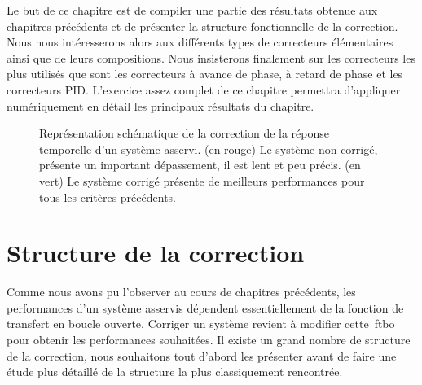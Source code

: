 Le but de ce chapitre est de compiler une partie des résultats obtenue aux
chapitres précédents et de présenter la structure fonctionnelle de la 
correction. Nous nous intéresserons alors aux différents types de correcteurs 
élémentaires ainsi que de leurs compositions. Nous insisterons finalement
sur les correcteurs les plus utilisés que sont les correcteurs à avance de
phase, à retard de phase et les correcteurs PID.
L'exercice assez complet de ce chapitre permettra d'appliquer numériquement
en détail les principaux résultats du chapitre. 
\captionsetup{width=0.7\linewidth}
\begin{figure}[!b]
    \centering
    
    \caption{Représentation schématique de la correction de la réponse 
             temporelle d'un système asservi. (en rouge) Le système non corrigé,
             présente un important dépassement, il est lent et peu précis. 
             (en vert) Le système corrigé présente de meilleurs performances 
             pour tous les critères précédents.\label{fig-necessite_correction}}
\end{figure}
\captionsetup{width=0.9\linewidth}
\clearpage
\section{Structure de la correction}
Comme nous avons pu l'observer au cours de chapitres précédents, les 
performances d'un système asservis dépendent essentiellement de la fonction
de transfert en boucle ouverte. Corriger un système revient à modifier 
cette~\gls{ftbo} pour obtenir les performances souhaitées. Il existe un grand
nombre de structure de la correction, nous souhaitons tout d'abord les 
présenter avant de faire une étude plus détaillé de la structure la plus 
classiquement rencontrée. 

